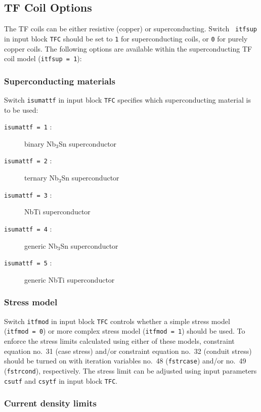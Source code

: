 \subsection{TF Coil Options}

The TF coils can be either resistive (copper) or superconducting. Switch {\tt
itfsup} in input block {\tt TFC} should be set to {\tt 1} for superconducting
coils, or {\tt 0} for purely copper coils. The following options are available
within the superconducting TF coil model ({\tt itfsup = 1}):

\subsubsection{Superconducting materials}

Switch {\tt isumattf} in input block {\tt TFC} specifies which superconducting
material is to be used:
\begin{description}
\item [{\tt isumattf = 1} :] binary Nb$_3$Sn superconductor
\item [{\tt isumattf = 2} :] ternary Nb$_3$Sn superconductor
\item [{\tt isumattf = 3} :] NbTi superconductor
\item [{\tt isumattf = 4} :] generic Nb$_3$Sn superconductor
\item [{\tt isumattf = 5} :] generic NbTi superconductor
\end{description}

\subsubsection{Stress model}

Switch {\tt itfmod} in input block {\tt TFC} controls whether a simple stress
model ({\tt itfmod~=~0}) or more complex stress model ({\tt itfmod = 1})
should be used. To enforce the stress limits calculated using either of these
models, constraint equation no.\ 31 (case stress) and/or constraint equation
no.\ 32 (conduit stress) should be turned on with iteration variables no.\ 48
({\tt fstrcase}) and/or no.\ 49 ({\tt fstrcond}), respectively. The stress
limit can be adjusted using input parameters {\tt csutf} and {\tt csytf} in
input block {\tt TFC}.

\subsubsection{Current density limits}

